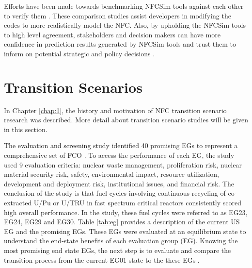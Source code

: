 Efforts have been made towards benchmarking \gls{NFCSim} 
tools against each other to verify them 
\cite{feng_standardized_2016,guerin_benchmark_2009}. 
These comparison studies assist developers in modifying the
codes to more realistically model the \gls{NFC}. 
Also, by upholding the \gls{NFCSim} tools to high level agreement, 
stakeholders and decision makers can have more confidence in 
prediction results generated by \gls{NFCSim} tools and trust them 
to inform on potential strategic and policy decisions
\cite{feng_standardized_2016}. 


\section{Transition Scenarios}
In Chapter \ref{chap:1}, the history and motivation of
\gls{NFC} transition scenario research was described.
More detail about transition scenario studies will be given 
in this section. 

The evaluation and screening study identified 40 promising 
\glspl{EG} to represent a comprehensive set of 
\gls{FCO} \cite{wigeland_nuclear_2014}. 
To access the performance of each \gls{EG}, the study
used 9 evaluation criteria: nuclear waste management, 
proliferation risk, nuclear material security risk, 
safety, environmental impact, resource utilization, 
development and deployment risk, institutional issues, and 
financial risk.  
The conclusion of the study is that fuel cycles
involving continuous recycling of co-extracted U/Pu or U/TRU in 
fast spectrum critical reactors consistently scored high overall 
performance.
In the study, these fuel cycles were referred to as EG23, EG24, 
EG29 and EG30. 
Table \ref{tab:eg} provides a description of the current 
\gls{US} \gls{EG} and the promising \glspl{EG}. 
These \glspl{EG} were evaluated at an equilibrium state to 
understand the end-state benefits of each evaluation group (EG).
Knowing the most promising end state \glspl{EG}, 
the next step is to evaluate and compare the transition process 
from the current EG01 
state to the these \glspl{EG} \cite{feng_standardized_2016}. 

